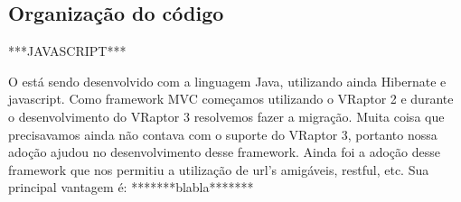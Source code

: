 \subsection{Organização do código}


***JAVASCRIPT***


O \calopsita está sendo desenvolvido com a linguagem Java, utilizando ainda Hibernate e javascript. Como framework MVC começamos utilizando o VRaptor 2 e durante o desenvolvimento do VRaptor 3 resolvemos fazer a migração. Muita coisa que precisavamos ainda não contava com o suporte do VRaptor 3, portanto nossa adoção ajudou no desenvolvimento desse framework. Ainda foi a adoção desse framework que nos permitiu a utilização de url's amigáveis, restful, etc. Sua principal vantagem é: *******blabla*******
